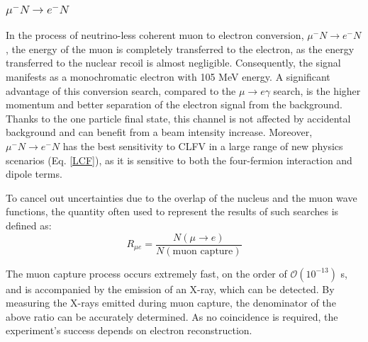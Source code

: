 \subsubsection{$\mu^- N \rightarrow e^- N $}
In the process of neutrino-less coherent muon to electron conversion, 
$\mu^- N \rightarrow e^- N$, the energy of the muon is completely 
transferred to the electron, as the energy transferred to the nuclear 
recoil is almost negligible. Consequently, the signal manifests 
 as a monochromatic electron with 105 MeV energy. A significant 
advantage of this conversion search, compared to the 
$\mu \rightarrow e \gamma$ search, is the higher momentum 
and better separation of the electron signal from the background. 
Thanks to the one particle final state, this channel is not affected
by  accidental
background and can benefit from a beam intensity increase.
Moreover, $\mu^- N \rightarrow e^- N $ has the best sensitivity to CLFV in a large range of 
new physics scenarios (Eq. \ref{LCF}), as it is sensitive to both the four-fermion interaction and dipole terms.

To cancel out uncertainties due to the overlap of the 
nucleus and the muon wave functions, the quantity often 
used to represent the results of such searches is defined as: 
\begin{equation} 
  R_{\mu e} = \frac{N(\mu \rightarrow e)}{N(\text{muon capture})} 
\end{equation} 

The muon capture process occurs extremely fast, 
on the order of $\mathcal{O}(10^{-13})$ s, and is 
accompanied by the emission of an X-ray, which can be detected. 
By measuring the X-rays emitted during muon capture, the denominator of 
the above ratio can be accurately determined. As no coincidence 
is required, the experiment's success depends  on  electron reconstruction.


